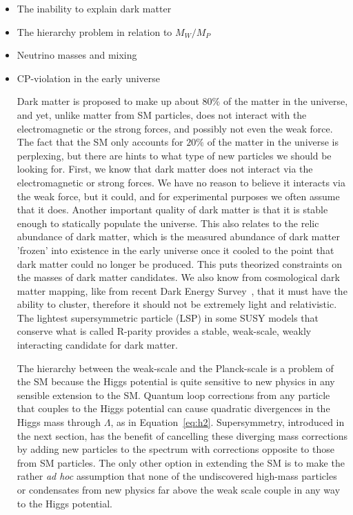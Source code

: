 \begin{itemize}
\item The inability to explain dark matter \cite{BERTONE2005279}
\item The hierarchy problem in relation to $M_W/M_P$
\item Neutrino masses and mixing \cite{1367-2630-16-4-045018}
\item CP-violation in the early universe \cite{Sakharov:1967dj}
 
Dark matter is proposed to make up about $80\%$ of the matter in the universe, and yet, unlike matter from SM particles, does not interact with the electromagnetic or the strong forces, and possibly not even the weak force.  The fact that the SM only accounts for $20\%$ of the matter in the universe is perplexing, but there are hints to what type of new particles we should be looking for.  First, we know that dark matter does not interact via the electromagnetic or strong forces.  We have no reason to believe it interacts via the weak force, but it could, and for experimental purposes we often assume that it does.  Another important quality of dark matter is that it is stable enough to statically populate the universe.  This also relates to the relic abundance of dark matter, which is the measured abundance of dark matter 'frozen' into existence in the early universe once it cooled to the point that dark matter could no longer be produced.  This puts theorized constraints on the masses of dark matter candidates.  We also know from cosmological dark matter mapping, like from recent Dark Energy Survey~\cite{surveydm}, that it must have the ability to cluster, therefore it should not be extremely light and relativistic.  The lightest supersymmetric particle (LSP) in some SUSY models that conserve what is called R-parity provides a stable, weak-scale, weakly interacting candidate for dark matter. 

The hierarchy between the weak-scale and the Planck-scale is a problem of the SM because the Higgs potential is quite sensitive to new physics in any sensible extension to the SM.  Quantum loop corrections from any particle that couples to the Higgs potential can cause quadratic divergences in the Higgs mass through $\Lambda$, as in Equation~\ref{eq:h2}.  Supersymmetry, introduced in the next section, has the benefit of cancelling these diverging mass corrections by adding new particles to the spectrum with corrections opposite to those from SM particles.  The only other option in extending the SM is to make the rather \textit{ad hoc} assumption that none of the undiscovered high-mass particles or condensates from new physics far above the weak scale couple in any way to the Higgs potential.  
\end{itemize}

